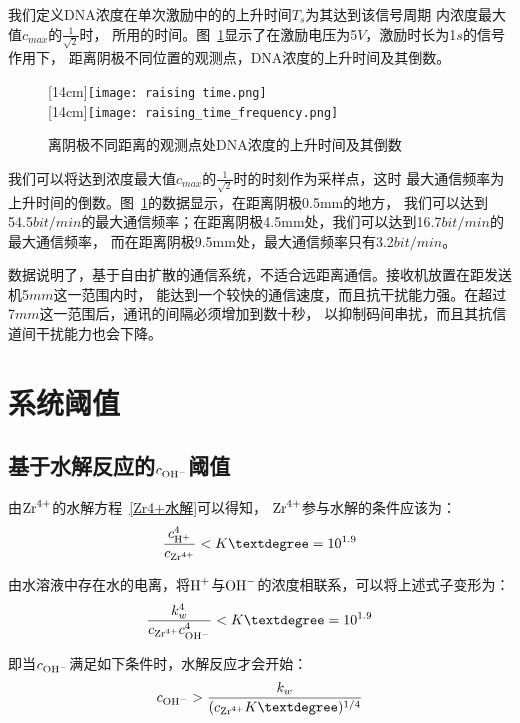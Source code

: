 我们定义DNA浓度在单次激励中的的上升时间$T_s$为其达到该信号周期
内浓度最大值$c_{max}$的$\frac{1}{\sqrt{2}}$时，
所用的时间。图~\ref{rising time}显示了在激励电压为5$V$，激励时长为1$s$的信号作用下，
距离阴极不同位置的观测点，DNA浓度的上升时间及其倒数。

\begin{figure}[H]
    \centering
                    [14cm]{\texttt{[image: raising time.png]}}\\
                    [14cm]{\texttt{[image: raising\_time\_frequency.png]}}\\
    \caption{离阴极不同距离的观测点处DNA浓度的上升时间及其倒数}
    \label{rising time}
\end{figure}

我们可以将达到浓度最大值$c_{max}$的$\frac{1}{\sqrt{2}}$时的时刻作为采样点，这时
最大通信频率为上升时间的倒数。图~\ref{rising time}的数据显示，在距离阴极0.5mm的地方，
我们可以达到54.5$bit/min$的最大通信频率；在距离阴极4.5mm处，我们可以达到16.7$bit/min$的最大通信频率，
而在距离阴极9.5mm处，最大通信频率只有3.2$bit/min$。

数据说明了，基于自由扩散的通信系统，不适合远距离通信。接收机放置在距发送机5$mm$这一范围内时，
能达到一个较快的通信速度，而且抗干扰能力强。在超过7$mm$这一范围后，通讯的间隔必须增加到数十秒，
以抑制码间串扰，而且其抗信道间干扰能力也会下降。

\section{系统阈值}
\subsection{基于水解反应的$c_{\ce{OH-}}$阈值}
由$\ce{Zr^4+}$的水解方程~\ref{Zr4+水解}可以得知，
$\ce{Zr^4+}$参与水解的条件应该为：
\begin{equation}
    \frac{c_{\ce{H+}}^4}{c_{\ce{Zr^4+}}  }<K°=10^{1.9}
\end{equation}

由水溶液中存在水的电离，将$\ce{H+}$与$\ce{OH-}$的浓度相联系，可以将上述式子变形为：
\begin{equation}
    \frac{k_w^4}{c_{\ce{Zr^4+}} c_{\ce{OH-}}^4 }<K°=10^{1.9}
\end{equation}

即当$c_{\ce{OH-}}$满足如下条件时，水解反应才会开始：
\begin{equation}
    c_{\ce{OH-}}>\frac{k_w}{(c_{\ce{Zr^4+}}K°)^{1/4}}
\end{equation}

